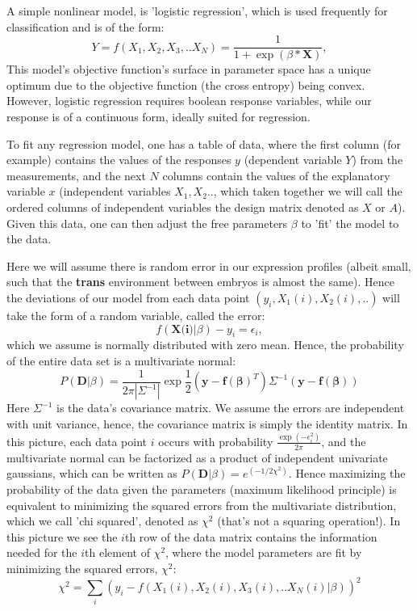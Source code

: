A simple nonlinear model, is 'logistic regression', which is used frequently for classification and is of the form:
\begin{equation}
Y=f(X_1, X_2, X_3,..X_N)= \frac{1}{1+\exp{(\beta * \textbf{X}) } },
\end{equation}
This model's objective function's surface in parameter space has a unique optimum due to the objective function (the cross entropy) being convex.  However, logistic regression requires boolean response variables, while our response is of a continuous form, ideally suited for regression.  

To fit any regression model, one has a table of data, where the first column (for example) contains the values of the responses $y$ (dependent variable $Y$) from the measurements, and the next $N$ columns contain the values of the explanatory variable $x$ (independent variables $X_1,X_2..$, which taken together we will call the ordered columns of independent variables the design matrix denoted as $X$ or $A$).  Given this data, one can then adjust the free parameters $\beta$ to 'fit' the model to the data.  

Here we will assume there is random error in our expression profiles (albeit small, such that the \textbf{trans} environment between embryos is almost the same). Hence the deviations of our model from each data point $(y_i, X_1(i),X_2(i),..)$ will take the form of a random variable, called the error: 
\begin{equation}
f(\textbf{X(i)}|\beta) - y_i =\epsilon_i,
\end{equation}
 which we assume is normally distributed with zero mean.  Hence, the probability of the entire data set is a multivariate normal:
\begin{equation}
 P(\mathbf{D}|\beta) = \frac{1}{2\pi |\Sigma^{-1}|}\exp{\frac{1}{2}(\mathbf{y}-\mathbf{f(\beta)}^{T})\Sigma^{-1}(\mathbf{y}-\mathbf{f(\beta)})}
 \end{equation}
 Here $\Sigma^{-1}$ is the data's covariance matrix.  We assume the errors are independent with unit variance, hence, the covariance matrix is simply the identity matrix.  In this picture, each data point $i$ occurs with probability $\frac{\exp{(-\epsilon_i^2)}}{2\pi}$, and the multivariate normal can be factorized as a product of independent univariate gaussians, which can be written as $P(\mathbf{D}| \beta) = e^{(-1/2\chi^2)}$.  Hence maximizing the probability of the data given the parameters (maximum likelihood principle) is equivalent to minimizing the squared errors from the multivariate distribution, which we call 'chi squared', denoted as $\chi^2$ (that's not a squaring operation!).  In this picture we see the $i$th row of the data matrix contains the information needed for the $i$th element of $\chi^2$, where the model parameters are fit by minimizing the squared errors, $\chi^2$:
\begin{equation}
\chi^2=\sum_i ( y_i - f(X_1(i), X_2(i), X_3(i),..X_N(i)|\beta) )^2
\end{equation}

